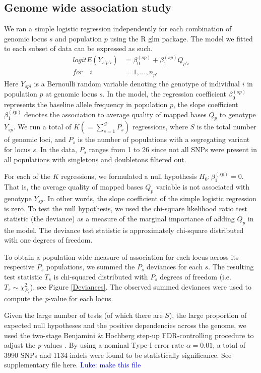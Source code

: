 \documentclass[9pt,lineno]{elife}
\newcommand{\luke}[1]{\textcolor{blue}{Luke: #1}}
\begin{document}
\subsection{Genome wide association study}
We ran a simple logistic regression independently for each combination of genomic locus $s$ and population $p$ using the R glm package\citep{RDevelopmentCoreTeam2016}. The model we fitted to each subset of data can be expressed as such.
\begin{align*}
{logit}{E(Y_{s'p'i})} &= \beta_{0}^{(sp)} + \beta_{1}^{(sp)} Q_{p'i}
\\
\textit{for}\quad i &= 1,\hdots, n_{p'}
\end{align*}
Here $Y_{spi}$ is a Bernoulli random variable denoting the genotype of individual $i$ in population $p$ at genomic locus $s$. 
In the model, the regression coefficient $\beta_{0}^{(sp)}$ represents the baseline allele frequency in population $p$, the slope coefficient $\beta_{1}^{(sp)}$ denotes the association to average quality of mapped bases $Q_{p}$ to genotype $Y_{sp}$. 
We run a total of $K (= \sum_{s=1}^S P_s)$ regressions, where $S$ is the total number of genomic loci, and $P_s$ is the number of populations with a segregating variant for locus $s$. 
In the data, $P_s$ ranges from 1 to 26 since not all SNPs were present in all populations with singletons and doubletons filtered out.

For each of the $K$ regressions, we formulated a null hypothesis $H_{0}: \beta_{1}^{(sp)}=0$. That is, the average quality of mapped bases $Q_{p}$ variable is not associated with genotype $Y_{sp}$.
In other words, the slope coefficient of the simple logistic regression is zero.
To test the null hypothesis, we used the chi-square likelihood ratio test statistic (the deviance) as a measure of the marginal importance of adding $Q_{p}$ in the model. 
The deviance test statistic is approximately chi-square distributed with one degrees of freedom.  

To obtain a population-wide measure of association for each locus across its respective $P_s$ populations, we summed the $P_s$ deviances for each $s$. The resulting test statistic $T_s$ is chi-squared distributed with $P_s$ degrees of freedom (i.e. $T_s \sim \chi^2_{P_s}$), see Figure \ref{Deviances}.
The observed summed deviances were used to compute the \textit{p}-value for each locus.


Given the large number of tests (of which there are $S$), the large proportion of expected null hypotheses and the positive dependencies across the genome, we used the two-stage Benjamini \& Hochberg step-up FDR-controlling procedure to adjust the \textit{p}-values \citep{Benjamini2006}.
By using a nominal Type-I error rate $\alpha = 0.01$, a total of 3990 SNPs and 1134 indels were found to be statistically significance. See supplementary file {here}. \luke{make this file}
\end{document}
